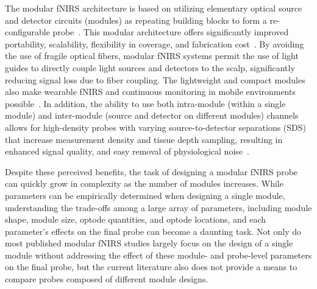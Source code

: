 The modular \ac{fNIRS} architecture is based on utilizing elementary optical source and detector circuits (modules) as repeating building blocks to form a re-configurable probe~\cite{Zhao2017}. This modular architecture offers significantly improved portability, scalability, flexibility in coverage, and fabrication cost~\cite{Zhao2017}. By avoiding the use of fragile optical fibers, modular \ac{fNIRS} systems permit the use of light guides to directly couple light sources and detectors to the scalp, significantly reducing signal loss due to fiber coupling. The lightweight and compact modules also make wearable \ac{fNIRS} and continuous monitoring in mobile environments possible~\cite{Yucel2017, Park2018}. In addition, the ability to use both intra-module (within a single module) and inter-module (source and detector on different modules) channels allows for high-density probes with varying source-to-detector separations (SDS) that increase measurement density and tissue depth sampling, resulting in enhanced signal quality, and easy removal of physiological noise~\cite{Gregg2010}. 

Despite these perceived benefits, the task of designing a modular \ac{fNIRS} probe can quickly grow in complexity as the number of modules increases. While parameters can be empirically determined when designing a single module, understanding the trade-offs among a large array of parameters, including module shape, module size, optode quantities, and optode locations, and each parameter's effects on the final probe can become a daunting task. Not only do most published modular \ac{fNIRS} studies largely focus on the design of a single module without addressing the effect of these module- and probe-level parameters on the final probe, but the current literature also does not provide a means to compare probes composed of different module designs.

